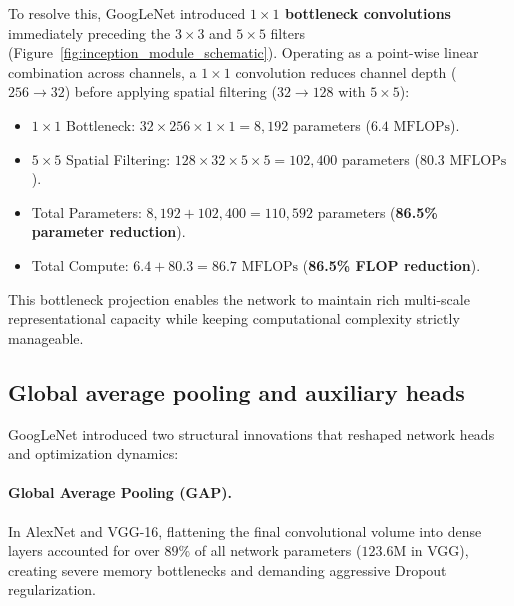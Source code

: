To resolve this, GoogLeNet introduced \textbf{$1 \times 1$ bottleneck convolutions} immediately preceding the $3 \times 3$ and $5 \times 5$ filters (Figure~\ref{fig:inception_module_schematic}). Operating as a point-wise linear combination across channels, a $1 \times 1$ convolution reduces channel depth ($256 \to 32$) before applying spatial filtering ($32 \to 128$ with $5 \times 5$):
\begin{itemize}[leftmargin=*]
  \item $1 \times 1$ Bottleneck: $32 \times 256 \times 1 \times 1 = 8,192$ parameters ($6.4\text{ MFLOPs}$).
  \item $5 \times 5$ Spatial Filtering: $128 \times 32 \times 5 \times 5 = 102,400$ parameters ($80.3\text{ MFLOPs}$).
  \item Total Parameters: $8,192 + 102,400 = 110,592$ parameters (\textbf{86.5\% parameter reduction}).
  \item Total Compute: $6.4 + 80.3 = 86.7\text{ MFLOPs}$ (\textbf{86.5\% FLOP reduction}).
\end{itemize}
This bottleneck projection enables the network to maintain rich multi-scale representational capacity while keeping computational complexity strictly manageable.

\subsection{Global average pooling and auxiliary heads}
\label{sec:googlenet_gap_auxiliary}

GoogLeNet introduced two structural innovations that reshaped network heads and optimization dynamics:

\paragraph{Global Average Pooling (GAP).}
In AlexNet and VGG-16, flattening the final convolutional volume into dense layers accounted for over $89\%$ of all network parameters ($123.6\text{M}$ in VGG), creating severe memory bottlenecks and demanding aggressive Dropout regularization.

